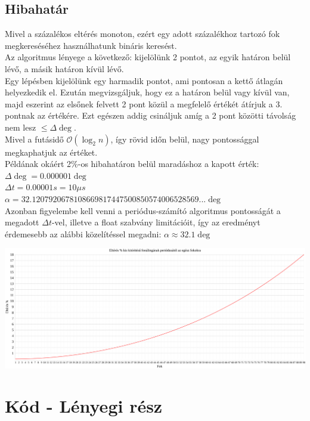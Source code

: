 \documentclass{article}
\begin{document}
\begin{multicols}{2}
\section{Hibahatár}
	Mivel a százalékos eltérés monoton, ezért egy adott százalékhoz tartozó
	fok megkereséséhez használhatunk bináris keresést. \\
	Az algoritmus lényege a
	következő: kijelölünk 2 pontot, az egyik határon belül lévő, a másik
	határon kívül lévő. \\
	Egy lépésben kijelölünk egy harmadik pontot, ami pontosan a
	kettő átlagán helyezkedik el. Ezután megvizsgáljuk, hogy ez a határon belül vagy
	kívül van, majd eszerint az elsőnek felvett 2 pont közül a megfelelő értékét
	átírjuk a 3. pontnak az értékére. Ezt egészen addig csináljuk amíg a 2 pont közötti
	távolság nem lesz $\leq\Delta\deg$. \\
	Mivel a futásidő $\mathcal{O}(\log_{2}n)$, így rövid időn belül, nagy pontossággal
	megkaphatjuk az értéket.\\
	Példának okáért 2\%-os hibahatáron belül maradáshoz a kapott érték:\\
	$\Delta\deg=0.000001\deg$ \\
	$\Delta t=0.00001s=10\mu s$ \\
	$\alpha = 32.1207920678108669817447500850574006528569...\deg$ \\
	Azonban figyelembe kell venni a periódus-számító algoritmus pontosságát a megadott
	$\Delta t$-vel, illetve a float szabvány limitációit, így az eredményt érdemesebb az
	alábbi közelítéssel megadni: $\alpha \approx 32.1 \deg$

\end{multicols}

\begin{center}
	\includegraphics[width=\linewidth]{../difference.png} \\
\end{center}

\section{Kód - Lényegi rész}
	
\end{document}
